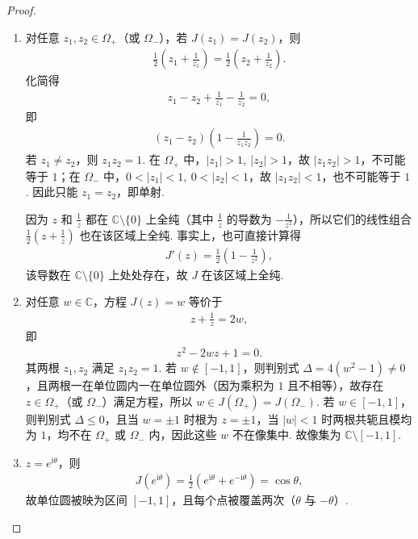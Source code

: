 \documentclass[../../main.tex]{subfiles}%
\begin{document}
\begin{proof}
\begin{enumerate}[(1)]
\item 对任意 $z_1,z_2\in\Omega_+$（或 $\Omega_-$），若 $J(z_1)=J(z_2)$，则
\begin{align*}
\frac12\left(z_1+\frac1{z_1}\right)=\frac12\left(z_2+\frac1{z_2}\right).
\end{align*}
化简得
\begin{align*}
z_1-z_2+\frac1{z_1}-\frac1{z_2}=0,
\end{align*}
即
\begin{align*}
(z_1-z_2)\left(1-\frac1{z_1z_2}\right)=0.
\end{align*}
若 $z_1\neq z_2$，则 $z_1z_2=1$. 在 $\Omega_+$ 中，$|z_1|>1,\ |z_2|>1$，故 $|z_1z_2|>1$，不可能等于 $1$；在 $\Omega_-$ 中，$0<|z_1|<1,\ 0<|z_2|<1$，故 $|z_1z_2|<1$，也不可能等于 $1$. 因此只能 $z_1=z_2$，即单射.

因为 $z$ 和 $\frac1z$ 都在 $\mathbb C\setminus\{0\}$ 上全纯（其中 $\frac1z$ 的导数为 $-\frac1{z^2}$），所以它们的线性组合 $\frac12(z+\frac1z)$ 也在该区域上全纯. 事实上，也可直接计算得
\begin{align*}
J'(z)=\frac12\left(1-\frac1{z^2}\right),
\end{align*}
该导数在 $\mathbb C\setminus\{0\}$ 上处处存在，故 $J$ 在该区域上全纯.

\item 对任意 $w\in\mathbb C$，方程 $J(z)=w$ 等价于
\begin{align*}
z+\frac1z=2w,
\end{align*}
即
\begin{align}
z^2-2wz+1=0. \label{eq:jouk}
\end{align}
其两根 $z_1,z_2$ 满足 $z_1z_2=1$. 若 $w\notin[-1,1]$，则判别式 $\Delta=4(w^2-1)\neq 0$，且两根一在单位圆内一在单位圆外（因为乘积为 $1$ 且不相等），故存在 $z\in\Omega_+$（或 $\Omega_-$）满足方程，所以 $w\in J(\Omega_+)=J(\Omega_-)$. 若 $w\in[-1,1]$，则判别式 $\Delta\leqslant 0$，且当 $w=\pm1$ 时根为 $z=\pm1$，当 $|w|<1$ 时两根共轭且模均为 $1$，均不在 $\Omega_+$ 或 $\Omega_-$ 内，因此这些 $w$ 不在像集中. 故像集为 $\mathbb C\setminus[-1,1]$.

\item $z=e^{\mathrm{i}\theta}$，则
\begin{align*}
J(e^{\mathrm{i}\theta})=\frac12(e^{\mathrm{i}\theta}+e^{-\mathrm{i}\theta})=\cos\theta,
\end{align*}
故单位圆被映为区间 $[-1,1]$，且每个点被覆盖两次（$\theta$ 与 $-\theta$）.


\end{enumerate}
\end{proof}
\end{document}
